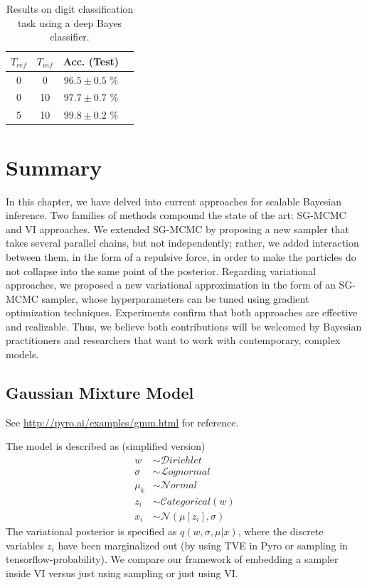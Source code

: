 \begin{table}[H]
\centering

\caption{Results on  digit classification task using a deep Bayes classifier.}\label{tab1}

\begin{tabular}{c@{\hskip 1.4in}c@{\hskip 1.3in}c@{\hskip 1.4in}c}
\toprule
${T_{ref}}$ &  ${T_{inf}}$ & \textbf{Acc. (Test)} \\
\midrule
0 & 0  & $96.5 \pm 0.5$ \% \\ 
0 & 10 &  $97.7 \pm 0.7$ \%\\
5 & 10 & $ {99.8 \pm 0.2}$ \% \\
\bottomrule
\end{tabular}
\end{table}

\section{Summary}

In this chapter, we have delved into current approaches for scalable Bayesian inference. Two families of methods compound the state of the art: SG-MCMC and VI approaches. We extended SG-MCMC by proposing a new sampler that takes several parallel chains, but not independently; rather, we added interaction between them, in the form of a repulsive force, in order to make the particles do not collapse into the same point of the posterior. Regarding variational approaches, we proposed a new variational approximation in the form of an SG-MCMC sampler, whose hyperparameters can be tuned using gradient optimization techniques. Experiments confirm that both approaches are effective and realizable. Thus, we believe both contributions will be welcomed by Bayesian practitioners and researchers that want to work with contemporary, complex models.

\iffalse
\subsection{Gaussian Mixture Model}

See \url{http://pyro.ai/examples/gmm.html} for reference.

The model is described as (simplified version)
\begin{align*}
    w &\sim \mathcal{D}irichlet \\
    \sigma &\sim \mathcal{L}ognormal \\
    \mu_k &\sim \mathcal{N}ormal \\
    z_i &\sim \mathcal{C}ategorical(w)  \\
    x_i &\sim \mathcal{N}(\mu\left[z_i\right], \sigma) 
\end{align*}
The variational posterior is specified as $q(w, \sigma, \mu | {x})$, where the discrete variables $z_i$ have been marginalized out (by using TVE in Pyro or sampling in tensorflow-probability). We compare our framework of embedding a sampler inside VI versus just using sampling or just using VI.

